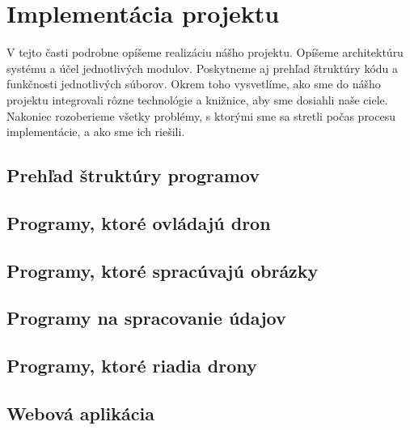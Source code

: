
\section{Implementácia projektu}
V tejto časti podrobne opíšeme realizáciu nášho projektu. Opíšeme architektúru systému a účel jednotlivých modulov. Poskytneme aj prehľad štruktúry kódu a funkčnosti jednotlivých súborov. Okrem toho vysvetlíme, ako sme do nášho projektu integrovali rôzne technológie a knižnice, aby sme dosiahli naše ciele. Nakoniec rozoberieme všetky problémy, s ktorými sme sa stretli počas procesu implementácie, a ako sme ich riešili.
\subsection{Prehľad štruktúry programov}  
\subsection{Programy, ktoré ovládajú dron}  
\subsection{Programy, ktoré spracúvajú obrázky}  
\subsection{Programy na spracovanie údajov}  
\subsection{Programy, ktoré riadia drony}  
\subsection{Webová aplikácia}  